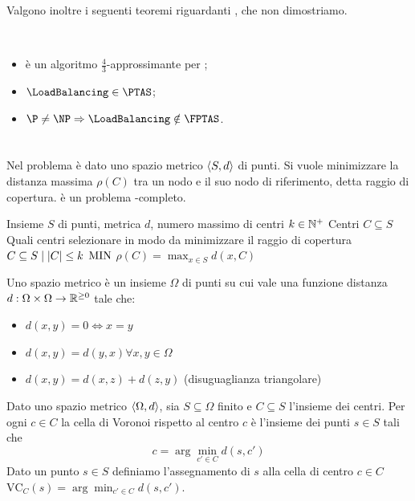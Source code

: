Valgono inoltre i seguenti teoremi riguardanti \LoadBalancing, che non dimostriamo.
\begin{theorem}~
	\begin{itemize}
		\item \SortedGreedyBalance è un algoritmo $\frac43$-approssimante per \LoadBalancing \cite{Graham:69:sortedgreedybalance};
		\item $\LoadBalancing\in\PTAS$;
		\item $\P\neq\NP\impl\LoadBalancing\notin\FPTAS$.
	\end{itemize}
\end{theorem}



\section{\CenterSelection}
Nel problema \CenterSelection è dato uno spazio metrico $\langle S,d \rangle$ di punti.
Si vuole minimizzare la distanza massima $\rho(C)$ tra un nodo e il suo nodo di riferimento, detta raggio di copertura.
\CenterSelection è un problema \NPO-completo.

\popt{\CenterSelection}
{Insieme $S$ di punti, metrica $d$, numero massimo di centri $k\in\mathbb N^+$}
{Centri $C\subseteq S$}
{Quali centri selezionare in modo da minimizzare il raggio di copertura}
{$C\subseteq S\mid | C |\leq k$}
{$\mathrm{MIN}$}
{$\rho(C) = \max_{x \in S} d(x, C)$}

Uno spazio metrico è un insieme $\Omega$ di punti su cui vale una funzione distanza $d:\Omega\times\Omega\to\mathbb R^{\geq0}$ tale che:
\begin{itemize}
	\item $d(x,y)=0\iff x=y$
	\item $d(x,y)=d(y,x)\forall x,y\in\Omega$
	\item $d(x,y)=d(x,z)+d(z,y)$ (disuguaglianza triangolare)
\end{itemize}

\begin{defin}
	Dato uno spazio metrico $\langle \Omega,d \rangle$, sia $S\subseteq\Omega$ finito e $C\subseteq S$ l'insieme dei centri. Per ogni $c\in C$ la cella di Voronoi rispetto al centro $c$ è l'insieme dei punti $s\in S$ tali che
	\begin{equation*}
		c=\arg\min_{c'\in C} d(s,c')
	\end{equation*}
	Dato un punto $s\in S$ definiamo l'assegnamento di $s$ alla cella di centro $c\in C$ $\text{VC}_C(s)=\arg\min_{c'\in C} d(s,c')$.
\end{defin}

